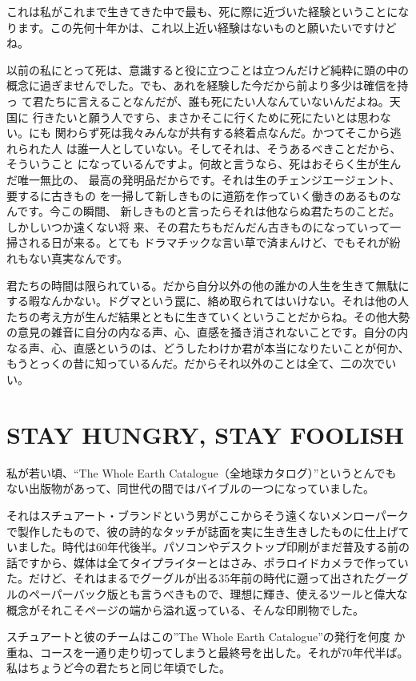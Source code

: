 \documentclass[a4paper,11pt,twocolumn]{jarticle}
\begin{document}
これは私がこれまで生きてきた中で最も、死に際に近づいた経験ということにな
ります。この先何十年かは、これ以上近い経験はないものと願いたいですけどね。

以前の私にとって死は、意識すると役に立つことは立つんだけど純粋に頭の中の
概念に過ぎませんでした。でも、あれを経験した今だから前より多少は確信を持っ
て君たちに言えることなんだが、誰も死にたい人なんていないんだよね。天国に
行きたいと願う人ですら、まさかそこに行くために死にたいとは思わない。にも
関わらず死は我々みんなが共有する終着点なんだ。かつてそこから逃れられた人
は誰一人としていない。そしてそれは、そうあるべきことだから、そういうこと
になっているんですよ。何故と言うなら、死はおそらく生が生んだ唯一無比の、
最高の発明品だからです。それは生のチェンジエージェント、要するに古きもの
を一掃して新しきものに道筋を作っていく働きのあるものなんです。今この瞬間、
新しきものと言ったらそれは他ならぬ君たちのことだ。しかしいつか遠くない将
来、その君たちもだんだん古きものになっていって一掃される日が来る。とても
ドラマチックな言い草で済まんけど、でもそれが紛れもない真実なんです。

君たちの時間は限られている。だから自分以外の他の誰かの人生を生きて無駄に
する暇なんかない。ドグマという罠に、絡め取られてはいけない。それは他の人
たちの考え方が生んだ結果とともに生きていくということだからね。その他大勢
の意見の雑音に自分の内なる声、心、直感を掻き消されないことです。自分の内
なる声、心、直感というのは、どうしたわけか君が本当になりたいことが何か、
もうとっくの昔に知っているんだ。だからそれ以外のことは全て、二の次でいい。

\section{STAY HUNGRY, STAY FOOLISH}

私が若い頃、``The Whole Earth Catalogue（全地球カタログ）''というとんでも
ない出版物があって、同世代の間ではバイブルの一つになっていました。

それはスチュアート・ブランドという男がここからそう遠くないメンローパーク
で製作したもので、彼の詩的なタッチが誌面を実に生き生きしたものに仕上げて
いました。時代は60年代後半。パソコンやデスクトップ印刷がまだ普及する前の
話ですから、媒体は全てタイプライターとはさみ、ポラロイドカメラで作ってい
た。だけど、それはまるでグーグルが出る35年前の時代に遡って出されたグーグ
ルのペーパーバック版とも言うべきもので、理想に輝き、使えるツールと偉大な
概念がそれこそページの端から溢れ返っている、そんな印刷物でした。

スチュアートと彼のチームはこの''The Whole Earth Catalogue''の発行を何度
か重ね、コースを一通り走り切ってしまうと最終号を出した。それが70年代半ば。
私はちょうど今の君たちと同じ年頃でした。
\end{document}
